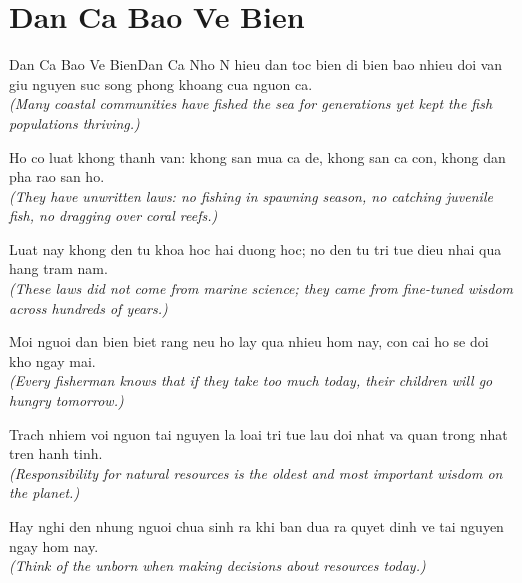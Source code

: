 \section{Dan Ca Bao Ve Bien}
\begin{truyen}{Dan Ca Bao Ve Bien}{Dan Ca Nho}
N hieu dan toc bien di bien bao nhieu doi van giu nguyen suc song phong khoang cua nguon ca.\\
\textit{(Many coastal communities have fished the sea for generations yet kept the fish populations thriving.)}

Ho co luat khong thanh van: khong san mua ca de, khong san ca con, khong dan pha rao san ho.\\
\textit{(They have unwritten laws: no fishing in spawning season, no catching juvenile fish, no dragging over coral reefs.)}

Luat nay khong den tu khoa hoc hai duong hoc; no den tu tri tue dieu nhai qua hang tram nam.\\
\textit{(These laws did not come from marine science; they came from fine-tuned wisdom across hundreds of years.)}

Moi nguoi dan bien biet rang neu ho lay qua nhieu hom nay, con cai ho se doi kho ngay mai.\\
\textit{(Every fisherman knows that if they take too much today, their children will go hungry tomorrow.)}

Trach nhiem voi nguon tai nguyen la loai tri tue lau doi nhat va quan trong nhat tren hanh tinh.\\
\textit{(Responsibility for natural resources is the oldest and most important wisdom on the planet.)}

\end{truyen}
\begin{baihoc}
  Hay nghi den nhung nguoi chua sinh ra khi ban dua ra quyet dinh ve tai nguyen ngay hom nay.\\
  \textit{(Think of the unborn when making decisions about resources today.)}
\end{baihoc}
